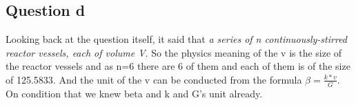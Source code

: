 \documentclass[11pt]{article}
\begin{document}
\subsection{Question d}

Looking back at the question itself, it said that \textit{a series of n continuously-stirred reactor vessels, each of volume V}. So the physics meaning of the v is the size of the reactor vessels and as n=6 there are 6 of them and each of them is of the size of 125.5833. And the unit of the v can be conducted from the formula $\beta = \frac{k*v}{G}$. On condition that we knew beta and k and G's unit already.
\end{document}

